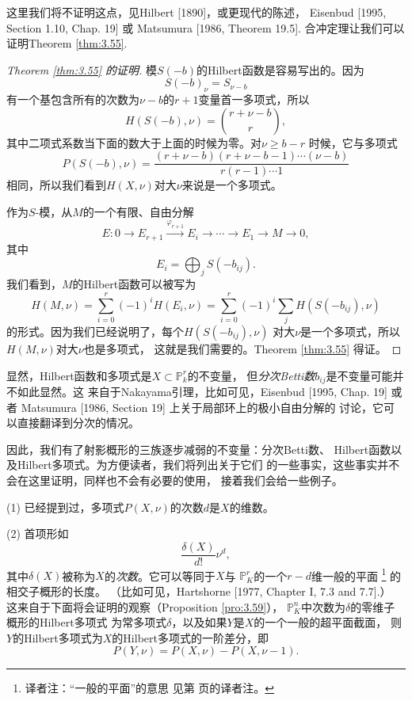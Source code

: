 这里我们将不证明这点，见Hilbert [1890]，或更现代的陈述，
Eisenbud [1995, Section 1.10, Chap. 19] 或 
Matsumura [1986, Theorem 19.5].
合冲定理让我们可以证明Theorem \ref{thm:3.55}.

\begin{proof}[{Theorem \ref{thm:3.55} 的证明}]
模$S(-b)$的Hilbert函数是容易写出的。因为
\[
	S(-b)_\nu=S_{\nu-b}
\]
有一个基包含所有的次数为$\nu-b$的$r+1$变量首一多项式，所以
\[
	H(S(-b),\nu)=\binom{r+\nu-b}r,
\]
其中二项式系数当下面的数大于上面的时候为零。对$\nu\geq b-r$
时候，它与多项式
\[
	P(S(-b),\nu)=\frac{(r+\nu-b)(r+\nu-b-1)\cdots (\nu-b)}
	{r(r-1)\cdots 1}
\]
相同，所以我们看到$H(X,\nu)$对大$\nu$来说是一个多项式。

作为$S$-模，从$M$的一个有限、自由分解
\[
	E:0 \longrightarrow E_{r+1} 
	\xrightarrow{\varphi_{r+1}}E_{i}
	\longrightarrow \cdots  \longrightarrow E_1 
	\longrightarrow M \longrightarrow 0,
\]
其中
\[
	E_i=\bigoplus_j S(-b_{ij}).
\]
我们看到，$M$的Hilbert函数可以被写为
\[
	H(M,\nu)=\sum_{i=0}^r (-1)^i H(E_i,\nu)
	=\sum_{i=0}^r(-1)^i\sum_j H(S(-b_{ij}),\nu)
\]
的形式。因为我们已经说明了，每个$H(S(-b_{ij}),\nu)$
对大$\nu$是一个多项式，所以$H(M,\nu)$对大$\nu$也是多项式，
这就是我们需要的。Theorem \ref{thm:3.55} 得证。
\end{proof}

显然，Hilbert函数和多项式是$X\subset \mathbb P_k^r$的不变量，
但\textit{分次Betti数}$b_{ij}$是不变量可能并不如此显然。这
来自于Nakayama引理，比如可见，Eisenbud [1995, Chap. 19] 或者
Matsumura [1986, Section 19] 上关于局部环上的极小自由分解的
讨论，它可以直接翻译到分次的情况。

因此，我们有了射影概形的三族逐步减弱的不变量：分次Betti数、
Hilbert函数以及Hilbert多项式。为方便读者，我们将列出关于它们
的一些事实，这些事实并不会在这里证明，同样也不会有必要的使用，
接着我们会给一些例子。

(1) 已经提到过，多项式$P(X,\nu)$的次数$d$是$X$的维数。

(2) 首项形如
\[
  \frac{\delta(X)}{d!}\nu^d,
\]
其中$\delta(X)$被称为$X$的\textit{次数}。它可以等同于$X$与
$\mathbb P_K^r$的一个$r-d$维一般的平面%
\footnote{译者注：“一般的平面”的意思
见第 \pageref{p:80} 页的译者注。}%
的相交子概形的长度。
（比如可见，Hartshorne [1977, Chapter I, 7.3 and 7.7].）
这来自于下面将会证明的观察（Proposition \ref{pro:3.59}），
$\mathbb P_K^n$中次数为$\delta$的零维子概形的Hilbert多项式
为常多项式$\delta$，以及如果$Y$是$X$的一个一般的超平面截面，
则$Y$的Hilbert多项式为$X$的Hilbert多项式的一阶差分，即
\[
  P(Y,\nu)=P(X,\nu)-P(X,\nu-1).
\]

